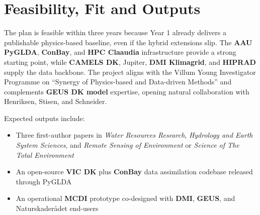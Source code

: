 \section{Feasibility, Fit and Outputs}

The plan is feasible within three years because Year 1 already delivers a publishable physics-based baseline, even if the hybrid extensions slip. The \textbf{AAU PyGLDA}, \textbf{ConBay}, and \textbf{HPC Claaudia} infrastructure provide a strong starting point, while \textbf{CAMELS DK}, Jupiter, \textbf{DMI Klimagrid}, and \textbf{HIPRAD} supply the data backbone. The project aligns with the Villum Young Investigator Programme on ``Synergy of Physics-based and Data-driven Methods'' and complements \textbf{GEUS DK model} expertise, opening natural collaboration with Henriksen, Stisen, and Schneider.



Expected outputs include:

\begin{itemize}
    \item Three first-author papers in \textit{Water Resources Research}, \textit{Hydrology and Earth System Sciences}, and \textit{Remote Sensing of Environment} or \textit{Science of The Total Environment}
    \item An open-source \textbf{VIC DK} plus \textbf{ConBay} data assimilation codebase released through PyGLDA
    \item An operational \textbf{MCDI} prototype co-designed with \textbf{DMI}, \textbf{GEUS}, and Naturskaderådet end-users
\end{itemize}
